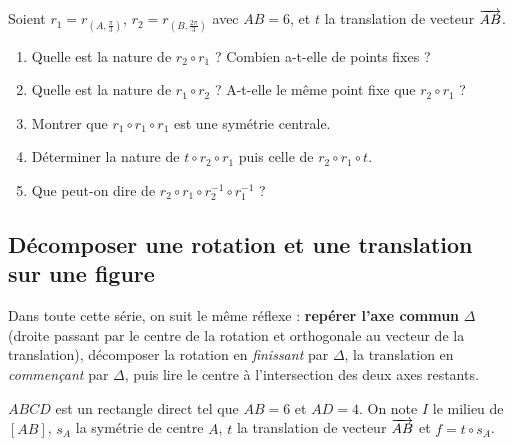 Soient $r_1=r_{(A,\frac{\pi}{3})}$, $r_2=r_{(B,\frac{2\pi}{3})}$ avec $AB=6$,
et $t$ la translation de vecteur $\overrightarrow{AB}$.
\begin{enumerate}
	\item Quelle est la nature de $r_2\circ r_1$ ? Combien a-t-elle de points
	fixes ?
	\item Quelle est la nature de $r_1\circ r_2$ ? A-t-elle le même point fixe
	que $r_2\circ r_1$ ?
	\item Montrer que $r_1\circ r_1\circ r_1$ est une symétrie centrale.
	\item Déterminer la nature de $t\circ r_2\circ r_1$ puis celle de
	$r_2\circ r_1 \circ t$.
	\item Que peut-on dire de $r_2\circ r_1\circ r_2^{-1}\circ r_1^{-1}$ ?
\end{enumerate}

\subsection{Décomposer une rotation et une translation sur une figure}

\begin{astucebac}
	Dans toute cette série, on suit le même réflexe : \textbf{repérer l'axe
	commun} $\Delta$ (droite passant par le centre de la rotation et
	orthogonale au vecteur de la translation), décomposer la rotation en
	\emph{finissant} par $\Delta$, la translation en \emph{commençant} par
	$\Delta$, puis lire le centre à l'intersection des deux axes restants.
\end{astucebac}

$ABCD$ est un rectangle direct tel que $AB=6$ et $AD=4$. On note $I$ le
milieu de $[AB]$, $s_A$ la symétrie de centre $A$, $t$ la translation de
vecteur $\overrightarrow{AB}$ et $f=t\circ s_A$.

\begin{center}
\end{center}

